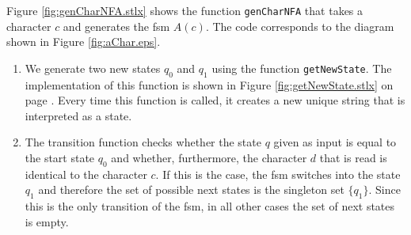 \begin{enumerate}
      Figure \ref{fig:genCharNFA.stlx} shows the function \texttt{genCharNFA} that takes a
      character $c$ and generates the fsm $A(c)$.  The code corresponds to the
      diagram shown in Figure \ref{fig:aChar.eps}.
      \begin{enumerate}
      \item We generate two new states $q_0$ and $q_1$ using the function
            \texttt{getNewState}.  The implementation of this function is shown in Figure
            \ref{fig:getNewState.stlx} on page \pageref{fig:getNewState.stlx}.  Every time this
            function is called, it creates a new unique string that is interpreted as a state.
      \item The transition function checks whether the state $q$ given as input is equal
            to the start state $q_0$ and whether, furthermore, the character $d$ that is
            read is identical to the character $c$.  If this is the case, the fsm switches
            into the state $q_1$ and therefore the set of possible next states is the singleton
            set $\{ q_1 \}$.  Since this is the only transition of the fsm, in all other
            cases the set of next states is empty.
      \end{enumerate}
      

\end{enumerate}
